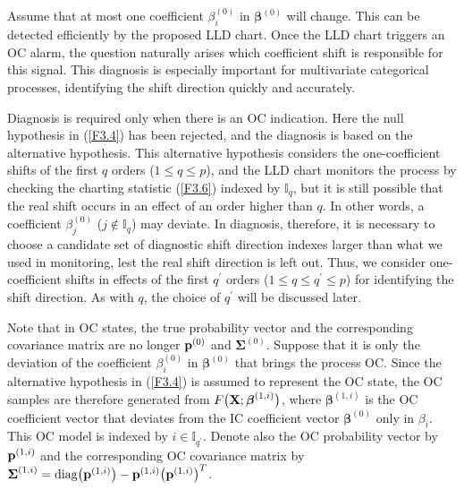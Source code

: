 Assume that at most one coefficient $\beta_i^{(0)}$ in $\bm{\beta}^{(0)}$ will
change. This can be detected efficiently by the proposed LLD chart. Once the LLD
chart triggers an OC alarm, the question naturally arises which coefficient shift is
responsible for this signal. This diagnosis is especially important for multivariate
categorical processes, identifying the shift direction quickly and accurately.

Diagnosis is required only when there is an OC indication. Here the null hypothesis
in (\ref{F3.4}) has been rejected, and the diagnosis is based on the alternative
hypothesis. This alternative hypothesis considers the one-coefficient shifts of the
first $q$ orders ($1\leq q\leq p$), and the LLD chart monitors the process by
checking the charting statistic (\ref{F3.6}) indexed by $\mathbb{I}_q$, but it is
still possible that the real shift occurs in an effect of an order higher than $q$.
In other words, a coefficient $\beta_j^{(0)}$ ($j\notin\mathbb{I}_q$) may deviate.
In diagnosis, therefore, it is necessary to choose a candidate set of diagnostic
shift direction indexes larger than what we used in monitoring, lest the real shift
direction is left out. Thus, we consider one-coefficient shifts in effects of the
first $q^{\prime}$ orders ($1\leq q\leq q^{\prime}\leq p$) for identifying the shift
direction. As with $q$, the choice of $q^{\prime}$ will be discussed later.

Note that in OC states, the true probability vector and the corresponding covariance
matrix are no longer ${\bf p}^{(0)}$ and $\bm{\Sigma}^{(0)}$. Suppose that it is
only the deviation of the coefficient $\beta_i^{(0)}$ in $\bm{\beta}^{(0)}$ that
brings the process OC. Since the alternative hypothesis in (\ref{F3.4}) is assumed
to represent the OC state, the OC samples are therefore generated from $F\big({\bf
X};\boldsymbol\beta^{(1,i)}\big)$, where $\bm\beta^{(1,i)}$ is the OC coefficient vector
that deviates from the IC coefficient vector $\bm\beta^{(0)}$ only in $\beta_i$.
This OC model is indexed by $i\in\mathbb{I}_{q^{\prime}}$. Denote also the OC
probability vector by ${\bf p}^{(1,i)}$ and the corresponding OC covariance matrix
by $\boldsymbol{\Sigma}^{(1,i)}=\mathrm{diag}\big({\bf p}^{(1,i)}\big)-{\bf p}^{(1,i)}\big({\bf
p}^{(1,i)}\big)^T$.

